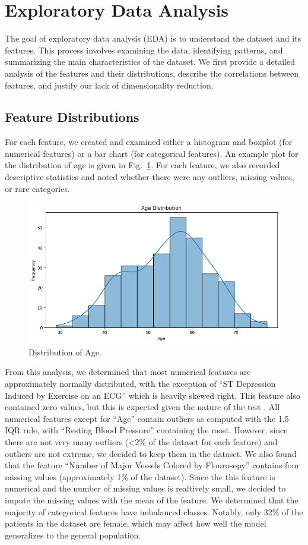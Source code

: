 \section{Exploratory Data Analysis}

The goal of exploratory data analysis (EDA) is to understand the dataset and its features. This process involves examining the data, identifying patterns, and summarizing the main characteristics of the dataset. We first provide a detailed analysis of the features and their distributions, describe the correlations between features, and justify our lack of dimensionality reduction.

\subsection{Feature Distributions}
For each feature, we created and examined either a histogram and boxplot (for numerical features) or a bar chart (for categorical features). An example plot for the distribution of age is given in Fig.~\ref{agedist}. For each feature, we also recorded descriptive statistics and noted whether there were any outliers, missing values, or rare categories.

\begin{figure}[htbp]
    \centerline{\includegraphics[width=0.7\columnwidth]{img/agedist.png}}
    \caption{Distribution of Age.}\label{agedist}
\end{figure}

From this analysis, we determined that most numerical features are approximately normally distributed, with the exception of ``ST Depression Induced by Exercise on an ECG'' which is heavily skewed right. This feature also contained zero values, but this is expected given the nature of the test \cite{katheria2021stdepression}. All numerical features except for ``Age'' contain outliers as computed with the 1.5 IQR rule, with ``Resting Blood Pressure'' containing the most. However, since there are not very many outliers (<2\% of the dataset for each feature) and outliers are not extreme, we decided to keep them in the dataset. We also found that the feature ``Number of Major Vessels Colored by Flourosopy'' contains four missing values (approximately 1\% of the dataset). Since the this feature is numerical and the number of missing values is realtively small, we decided to impute the missing values with the mean of the feature.
We determined that the majority of categorical features have imbalanced classes. Notably, only 32\% of the patients in the dataset are female, which may affect how well the model generalizes to the general population.

